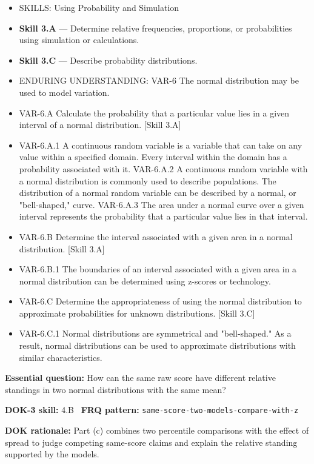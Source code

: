 \documentclass[11pt]{article}
\begin{document}


{\small
\begin{itemize}[leftmargin=1.5em,itemsep=2pt,topsep=2pt]
  \item SKILLS: Using Probability and Simulation
  \item \textbf{Skill 3.A} --- Determine relative frequencies, proportions, or probabilities using simulation or calculations.
  \item \textbf{Skill 3.C} --- Describe probability distributions.
  \item ENDURING UNDERSTANDING: VAR-6 The normal distribution may be used to model variation.
  \item VAR-6.A Calculate the probability that a particular value lies in a given interval of a normal distribution. [Skill 3.A]
  \item VAR-6.A.1 A continuous random variable is a variable that can take on any value within a specified domain. Every interval within the domain has a probability associated with it. VAR-6.A.2 A continuous random variable with a normal distribution is commonly used to describe populations. The distribution of a normal random variable can be described by a normal, or "bell-shaped," curve. VAR-6.A.3 The area under a normal curve over a given interval represents the probability that a particular value lies in that interval.
  \item VAR-6.B Determine the interval associated with a given area in a normal distribution. [Skill 3.A]
  \item VAR-6.B.1 The boundaries of an interval associated with a given area in a normal distribution can be determined using z-scores or technology.
  \item VAR-6.C Determine the appropriateness of using the normal distribution to approximate probabilities for unknown distributions. [Skill 3.C]
  \item VAR-6.C.1 Normal distributions are symmetrical and "bell-shaped." As a result, normal distributions can be used to approximate distributions with similar characteristics.
\end{itemize}
}
\textbf{Essential question:} How can the same raw score have different relative standings in two normal distributions with the same mean?\par
\textbf{DOK-3 skill:} 4.B \textperiodcentered\ \textbf{FRQ pattern:} {\small\texttt{same-\allowbreak{}score-\allowbreak{}two-\allowbreak{}models-\allowbreak{}compare-\allowbreak{}with-\allowbreak{}z}}\par
\textbf{DOK rationale:} Part (c) combines two percentile comparisons with the effect of spread to judge competing same-score claims and explain the relative standing supported by the models.\par
\end{document}
